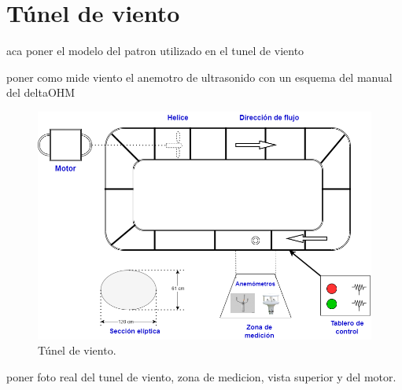\section{Túnel de viento}

aca poner el modelo del patron utilizado en el tunel de viento

poner como mide viento el anemotro de ultrasonido con un esquema del manual del deltaOHM

\begin{figure}[H]
    \centering
    \includegraphics[width=1\linewidth]{Figuras/viento/TunelVientoEsquema.png}
    \caption{Túnel de viento.}
    \label{fig:tunelVientoEsquema}
\end{figure}

poner foto real del tunel de viento, zona de medicion, vista superior y del motor.
